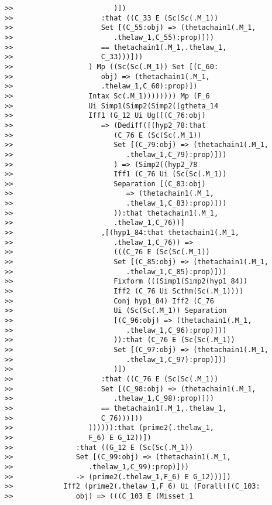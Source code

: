 \documentclass[12pt]{article}
\begin{document}
\begin{verbatim}
>>                        )])
>>                     :that ((C_33 E (Sc(Sc(.M_1))
>>                     Set [(C_55:obj) => (thetachain1(.M_1,
>>                        .thelaw_1,C_55):prop)]))
>>                     == thetachain1(.M_1,.thelaw_1,
>>                     C_33)))]))
>>                  ) Mp ((Sc(Sc(.M_1)) Set [(C_60:
>>                     obj) => (thetachain1(.M_1,
>>                     .thelaw_1,C_60):prop)])
>>                  Intax Sc(.M_1)))))))) Mp (F_6
>>                  Ui Simp1(Simp2(Simp2((gtheta_14
>>                  Iff1 (G_12 Ui Ug([(C_76:obj)
>>                     => (Dediff([(hyp2_78:that
>>                        (C_76 E (Sc(Sc(.M_1))
>>                        Set [(C_79:obj) => (thetachain1(.M_1,
>>                           .thelaw_1,C_79):prop)]))
>>                        ) => (Simp2((hyp2_78
>>                        Iff1 (C_76 Ui (Sc(Sc(.M_1))
>>                        Separation [(C_83:obj)
>>                           => (thetachain1(.M_1,
>>                           .thelaw_1,C_83):prop)]))
>>                        )):that thetachain1(.M_1,
>>                        .thelaw_1,C_76))]
>>                     ,[(hyp1_84:that thetachain1(.M_1,
>>                        .thelaw_1,C_76)) =>
>>                        (((C_76 E (Sc(Sc(.M_1))
>>                        Set [(C_85:obj) => (thetachain1(.M_1,
>>                           .thelaw_1,C_85):prop)]))
>>                        Fixform (((Simp1(Simp2(hyp1_84))
>>                        Iff2 (C_76 Ui Scthm(Sc(.M_1))))
>>                        Conj hyp1_84) Iff2 (C_76
>>                        Ui (Sc(Sc(.M_1)) Separation
>>                        [(C_96:obj) => (thetachain1(.M_1,
>>                           .thelaw_1,C_96):prop)]))
>>                        )):that (C_76 E (Sc(Sc(.M_1))
>>                        Set [(C_97:obj) => (thetachain1(.M_1,
>>                           .thelaw_1,C_97):prop)]))
>>                        )])
>>                     :that ((C_76 E (Sc(Sc(.M_1))
>>                     Set [(C_98:obj) => (thetachain1(.M_1,
>>                        .thelaw_1,C_98):prop)]))
>>                     == thetachain1(.M_1,.thelaw_1,
>>                     C_76)))]))
>>                  )))))):that (prime2(.thelaw_1,
>>                  F_6) E G_12))])
>>               :that ((G_12 E (Sc(Sc(.M_1))
>>               Set [(C_99:obj) => (thetachain1(.M_1,
>>                  .thelaw_1,C_99):prop)]))
>>               -> (prime2(.thelaw_1,F_6) E G_12)))])
>>            Iff2 (prime2(.thelaw_1,F_6) Ui (Forall([(C_103:
>>               obj) => (((C_103 E (Misset_1

\end{verbatim}
\end{document}
